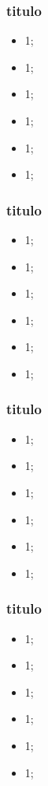\documentclass{beamer}
\begin{document}
\begin{frame}
    \frametitle{titulo}

    \begin{itemize}
        \item 1;
        \item 1;
        \item 1;
        \item 1;
        \item 1;
        \item 1;
    \end{itemize}
\end{frame}

\begin{frame}
    \frametitle{titulo}

    \begin{itemize}
        \item 1;
        \item 1;
        \item 1;
        \item 1;
        \item 1;
        \item 1;
    \end{itemize}
\end{frame}

\begin{frame}
    \frametitle{titulo}

    \begin{itemize}
        \item 1;
        \item 1;
        \item 1;
        \item 1;
        \item 1;
        \item 1;
    \end{itemize}
\end{frame}

\begin{frame}
    \frametitle{titulo}

    \begin{itemize}
        \item 1;
        \item 1;
        \item 1;
        \item 1;
        \item 1;
        \item 1;
    \end{itemize}
\end{frame}
\end{document}

